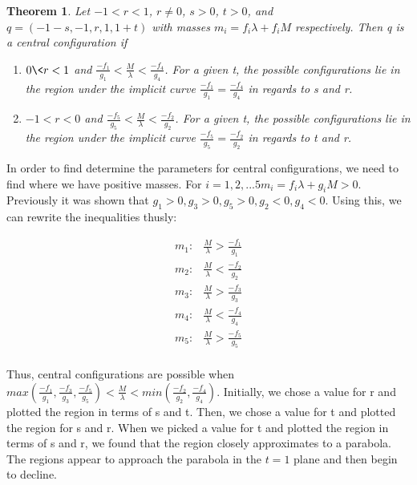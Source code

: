 \documentclass[11pt,leqno]{article}
\newtheorem{theorem}{Theorem}[section]
\theoremstyle{definition}
\theoremstyle{remark}
\numberwithin{equation}{section}
\begin{document}
\begin{theorem}\label{thm5}
\emph{Let $-1<r<1$, $r\neq0$, $s>0$, $t>0$, and $q=(-1-s,-1,r,1,1+t)$
with masses $m_{i}=f_{i}\lambda+f_{i}M$ respectively. Then q is a
central configuration if }
\begin{enumerate}
\item \emph{$0\< r<1$ and $\frac{-f_{1}}{g_{1}}<\frac{M}{\lambda}<\frac{-f_{4}}{g_{4}}$.
For a given t, the possible configurations lie in the region under
the implicit curve $\frac{-f_{1}}{g_{1}}=\frac{-f_{4}}{g_{4}}$ in
regards to s and r.}
\item \emph{$-1<r<0$ and $\frac{-f_{5}}{g_{5}}<\frac{M}{\lambda}<\frac{-f_{2}}{g_{2}}$.
For a given t, the possible configurations lie in the region under
the implicit curve $\frac{-f_{5}}{g_{5}}=\frac{-f_{2}}{g_{2}}$ in
regards to t and r.}\end{enumerate}
\end{theorem}

In order to find determine the parameters for central configurations, we need to find where we have positive masses. For $i={1,2,...5} m_i = f_i\lambda + g_iM > 0$. Previously it was shown that $g_1 > 0, g_3 > 0, g_5 > 0, g_2 < 0, g_4 < 0$. Using this, we can rewrite the inequalities thusly: 

\begin{equation} \begin{array}{ll}
m_1: & \frac{M}{\lambda} > \frac{-f_1}{g_1} \\
m_2: & \frac{M}{\lambda} < \frac{-f_2}{g_2} \\
m_3: & \frac{M}{\lambda} > \frac{-f_3}{g_3} \\
m_4: & \frac{M}{\lambda} < \frac{-f_4}{g_4} \\
m_5: & \frac{M}{\lambda} > \frac{-f_5}{g_5} \\
\end{array}
\end{equation}

Thus, central configurations are possible when $max(\frac{-f_1}{g_1},\frac{-f_3}{g_3},\frac{-f_5}{g_5})<\frac{M}{\lambda}<min(\frac{-f_2}{g_2},\frac{-f_4}{g_4})$. Initially, we chose a value for r and plotted the region in terms of s and t. Then, we chose a value for t and plotted the region for s and r. When we picked a value for t and plotted the region in terms of s and r, we found that the region closely approximates to a parabola. The regions appear to approach the parabola in the $t=1$ plane and then begin to decline.
\end{document}

